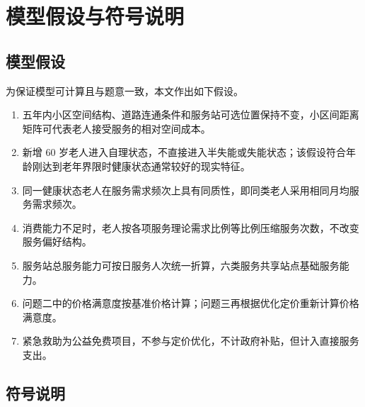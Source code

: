 \section{模型假设与符号说明}

\subsection{模型假设}

为保证模型可计算且与题意一致，本文作出如下假设。

\begin{enumerate}
    \item 五年内小区空间结构、道路连通条件和服务站可选位置保持不变，小区间距离矩阵可代表老人接受服务的相对空间成本。
    \item 新增 60 岁老人进入自理状态，不直接进入半失能或失能状态；该假设符合年龄刚达到老年界限时健康状态通常较好的现实特征。
    \item 同一健康状态老人在服务需求频次上具有同质性，即同类老人采用相同月均服务需求频次。
    \item 消费能力不足时，老人按各项服务理论需求比例等比例压缩服务次数，不改变服务偏好结构。
    \item 服务站总服务能力可按日服务人次统一折算，六类服务共享站点基础服务能力。
    \item 问题二中的价格满意度按基准价格计算；问题三再根据优化定价重新计算价格满意度。
    \item 紧急救助为公益免费项目，不参与定价优化，不计政府补贴，但计入直接服务支出。
\end{enumerate}

\subsection{符号说明}

